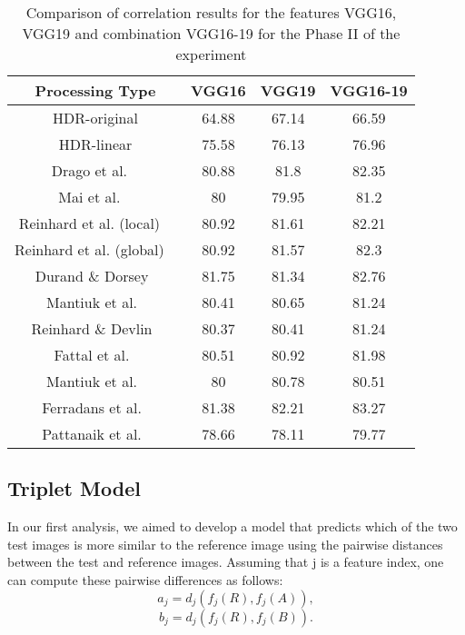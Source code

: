 \begin{table}
\caption{Comparison of correlation results for the features VGG16, VGG19 and combination VGG16-19 for the Phase II of the experiment}
\label{tab:fuse_vgg_phaseII}
\begin{tabular}{c|c|c|c}
\textbf{Processing Type} & \textbf{VGG16} & \textbf{VGG19} & \textbf{VGG16-19} \\
\hline
HDR-original &  64.88  &  67.14  &  66.59 \\
HDR-linear &  75.58   & 76.13 & 76.96 \\
Drago et al. ~\cite{drago2003adaptive} &  80.88 &    81.8 &    82.35 \\
Mai et al. ~\cite{mai2011subjective} &  80 &   79.95    & 81.2 \\
Reinhard et al. (local) ~\cite{reinhard2002photographic} & 80.92 &    81.61 &    82.21 \\
Reinhard et al. (global) ~\cite{reinhard2002photographic} & 80.92   & 81.57   &  82.3 \\
Durand \& Dorsey~\cite{durand2002fast} & 81.75   & 81.34  &  82.76 \\
Mantiuk et al.~\cite{mantiuk2006backward} & 80.41   & 80.65 &   81.24 \\
Reinhard \& Devlin~\cite{reinhard2005dynamic} & 80.37  &  80.41 &    81.24 \\
Fattal et al.~\cite{durand2002fast} & 80.51   & 80.92 &    81.98 \\
Mantiuk et al.~\cite{mantiuk2008modeling} &  80   & 80.78   & 80.51 \\
Ferradans et al.~\cite{ferradans2011analysis} & 81.38 &    82.21 &    83.27 \\
Pattanaik et al.~\cite{pattanaik2000time} & 78.66   & 78.11   & 79.77
\end{tabular}
\end{table}



\subsection{Triplet Model}
In our first analysis, we aimed to develop a model that
predicts which of the two test images is more similar to the reference image using the pairwise distances between the test and reference images. Assuming that j is a feature index, one can compute these pairwise differences as follows:
\begin{equation}
    a_j = d_j(f_j(R), f_j(A)), 
\end{equation}
\begin{equation}
   b_j = d_j(f_j(R), f_j(B)). 
\end{equation}

